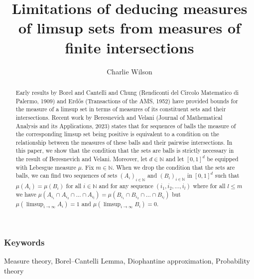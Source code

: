 \documentclass[12pt]{article}
\title{Limitations of deducing measures of limsup sets from measures of finite intersections}
\author{Charlie Wilson}
\date{}
\begin{document}
\maketitle

\newtheorem{lemma}{Lemma}[section]
\newtheorem*{definition}{Definition}
\newtheorem*{remark}{Remark}
\newtheorem{theorem}{Theorem}[section]
\newtheorem*{theorem*}{Theorem}
\newtheorem{corollary}{Corollary}[section]
\newtheorem{prop}{Proposition}[section]
\newtheorem{question}{Question}

\newtheorem*{theoremKS*}{Kochen--Stone Theorem (1964)}
\newtheorem*{theoremSV*}{Theorem BV1}
\newtheorem*{theoremBCC*}{Convergence Borel--Cantelli Lemma (1909)}
\newtheorem*{theoremBCD*}{Divergence Borel--Cantelli Lemma (1909)}
\newtheorem*{theoremFrolov*}{Theorem Frolov 2012}

\begin{abstract}
   Early results by Borel and Cantelli and Chung (Rendiconti del Circolo Matematico di Palermo, 1909) and Erd\H{o}s (Transactions of the AMS, 1952) have provided bounds for the measure of a limsup set in terms of measures of its constituent sets and their intersections. Recent work by Beresnevich and Velani (Journal of Mathematical Analysis and its Applications, 2023) states that for sequences of balls the measure of the corresponding limsup set being positive is equivalent to a condition on the relationship between the measures of these balls and their pairwise intersections. In this paper, we show that the condition that the sets are balls is strictly necessary in the result of Beresnevich and Velani. Moreover, let $d \in \mathbb{N}$ and let $[0,1]^d$ be equipped with Lebesgue measure $\mu$. Fix $m \in \mathbb{N}$. When we drop the condition that the sets are balls, we can find two sequences of sets $(A_i)_{i \in \mathbb{N}}$ and $(B_i)_{i \in \mathbb{N}}$ in $[0,1]^d$ such that $\mu(A_i)=\mu(B_i)$ for all $i \in \mathbb{N}$ and for any sequence $(i_1,i_2,...,i_l)$ where for all $l \leq m$ we have $\mu(A_{i_1}\cap A_{i_2} \cap... \cap A_{i_l})=\mu(B_{i_1}\cap B_{i_2} \cap... \cap B_{i_l})$ but $\mu(\limsup_{i \rightarrow \infty} A_i)=1$ and $\mu(\limsup_{i \rightarrow \infty} B_i)=0$.
  
\end{abstract}


\subsubsection*{Keywords}
Measure theory, Borel--Cantelli Lemma, Diophantine approximation, Probability theory
\end{document}
